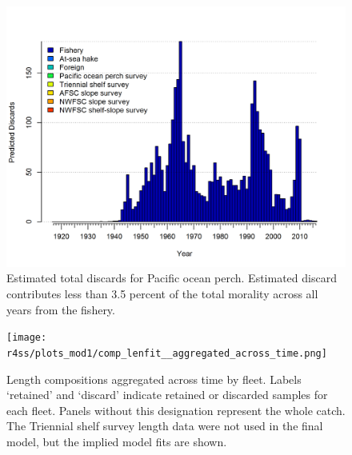 \documentclass[12pt,]{article}
\begin{document}
\begin{figure}
\centering
\includegraphics{r4ss/plots_mod1/catch7 discards stacked plot (depends on multiple fleets).png}
\caption{Estimated total discards for Pacific ocean perch. Estimated
discard contributes less than 3.5 percent of the total morality across
all years from the fishery. \label{fig:total_discard}}
\end{figure}

\begin{figure}
\centering
\texttt{[image: r4ss/plots\_mod1/comp\_lenfit\_\_aggregated\_across\_time.png]}
\caption{Length compositions aggregated across time by fleet. Labels
`retained' and `discard' indicate retained or discarded samples for each
fleet. Panels without this designation represent the whole catch. The
Triennial shelf survey length data were not used in the final model, but
the implied model fits are shown. \label{fig:length_agg}}
\end{figure}
\end{document}

